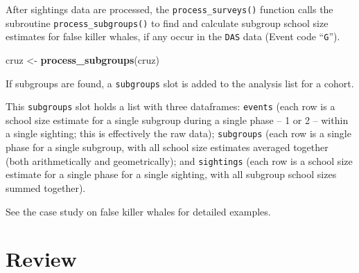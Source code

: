 \documentclass[
]{book}
\newenvironment{Shaded}{\begin{snugshade}}{\end{snugshade}}
\newcommand{\DecValTok}[1]{\textcolor[rgb]{0.00,0.00,0.81}{#1}}
\newcommand{\KeywordTok}[1]{\textcolor[rgb]{0.13,0.29,0.53}{\textbf{#1}}}
\newcommand{\NormalTok}[1]{#1}
\newcommand{\OperatorTok}[1]{\textcolor[rgb]{0.81,0.36,0.00}{\textbf{#1}}}
\newcommand{\StringTok}[1]{\textcolor[rgb]{0.31,0.60,0.02}{#1}}
\begin{document}
After sightings data are processed, the \texttt{process\_surveys()} function calls the subroutine \texttt{process\_subgroups()} to find and calculate subgroup school size estimates for false killer whales, if any occur in the \texttt{DAS} data (Event code ``\texttt{G}'').

\begin{Shaded}
\begin{Highlighting}[]
\NormalTok{cruz <-}\StringTok{ }\KeywordTok{process_subgroups}\NormalTok{(cruz) }
\end{Highlighting}
\end{Shaded}

If subgroups are found, a \texttt{subgroups} slot is added to the analysis list for a cohort.

\begin{Shaded}
\end{Shaded}

This \texttt{subgroups} slot holds a list with three dataframes: \texttt{events} (each row is a school size estimate for a single subgroup during a single phase -- 1 or 2 -- within a single sighting; this is effectively the raw data); \texttt{subgroups} (each row is a single phase for a single subgroup, with all school size estimates averaged together (both arithmetically and geometrically); and \texttt{sightings} (each row is a school size estimate for a single phase for a single sighting, with all subgroup school sizes summed together).

\begin{Shaded}
\end{Shaded}

See the case study on false killer whales for detailed examples.

\hypertarget{review}{%
\section*{Review}\label{review}}
\end{document}
